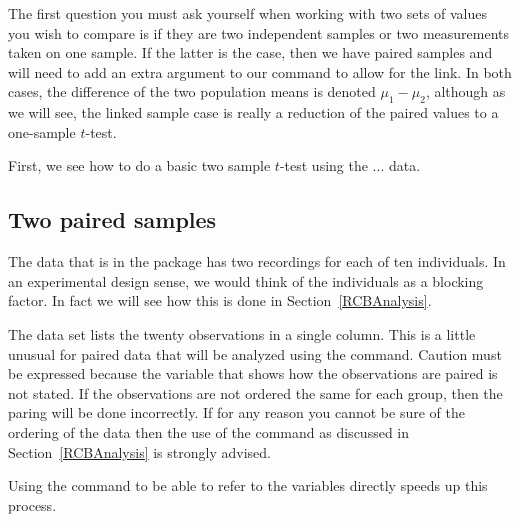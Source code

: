 The first question you must ask yourself when working with two sets of values you wish to compare is if they are two independent samples or two measurements taken on one sample. If the latter is the case, then we have paired samples and will need to add an extra argument to our command to allow for the link. In both cases, the difference of the two population means is denoted $\mu_1-\mu_2$, although as we will see, the linked sample case is really a reduction of the paired values to a one-sample $t$-test.  
 
First, we see how to do a basic two sample $t$-test using the ... data. 
 
\subsection{Two paired samples} 
\label{PairedSamplesTTest} 
 
The  data that is in the  package has two recordings for each of ten individuals. In an experimental design sense, we would think of the individuals as a blocking factor. In fact we will see how this is done in Section~\ref{RCBAnalysis}. 
 
The data set lists the twenty observations in a single column. This is a little unusual for paired data that will be analyzed using the  command. Caution must be expressed because the variable that shows how the observations are paired is not stated. If the observations are not ordered the same for each group, then the paring will be done incorrectly. If for any reason you cannot be sure of the ordering of the data then the use of the  command as discussed in Section~\ref{RCBAnalysis} is strongly advised. 
 
Using the  command to be able to refer to the variables directly speeds up this process. 
\begin{knitrout}
\color{fgcolor}\begin{kframe}
\begin{alltt}
\hlstd{> }
\end{alltt}
\end{kframe}
\end{knitrout}
 
